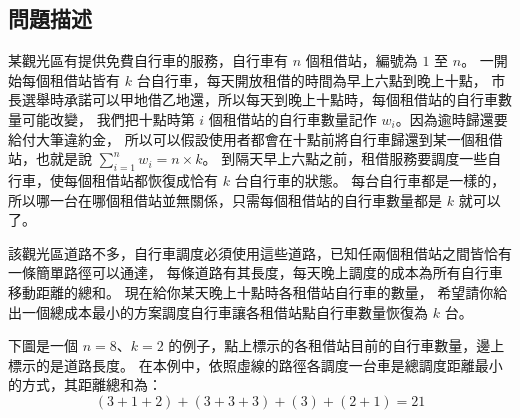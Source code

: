 \subsection{問題描述}

某觀光區有提供免費自行車的服務，自行車有 \begin{math}n\end{math}
個租借站，編號為 \begin{math}1\end{math} 至 \begin{math}n\end{math}。
一開始每個租借站皆有 \begin{math}k\end{math}
台自行車，每天開放租借的時間為早上六點到晚上十點，
市長選舉時承諾可以甲地借乙地還，所以每天到晚上十點時，每個租借站的自行車數量可能改變，
我們把十點時第 \begin{math}i\end{math} 個租借站的自行車數量記作
\begin{math}w_i\end{math}。因為逾時歸還要給付大筆違約金，
所以可以假設使用者都會在十點前將自行車歸還到某一個租借站，也就是說
\begin{math}\displaystyle\sum_{i=1}^n w_i = n\times k\end{math}。
到隔天早上六點之前，租借服務要調度一些自行車，使每個租借站都恢復成恰有
\begin{math}k\end{math} 台自行車的狀態。
每台自行車都是一樣的，所以哪一台在哪個租借站並無關係，只需每個租借站的自行車數量都是
\begin{math}k\end{math} 就可以了。

該觀光區道路不多，自行車調度必須使用這些道路，已知任兩個租借站之間皆恰有一條簡單路徑可以通達，
每條道路有其長度，每天晚上調度的成本為所有自行車移動距離的總和。
現在給你某天晚上十點時各租借站自行車的數量，
希望請你給出一個總成本最小的方案調度自行車讓各租借站點自行車數量恢復為
\begin{math}k\end{math} 台。

下圖是一個 \begin{math}n = 8\end{math}、\begin{math}k = 2\end{math}
的例子，點上標示的各租借站目前的自行車數量，邊上標示的是道路長度。
在本例中，依照虛線的路徑各調度一台車是總調度距離最小的方式，其距離總和為：
\[(3 + 1 + 2) + (3 + 3 + 3) + (3) + (2 + 1) = 21\]

